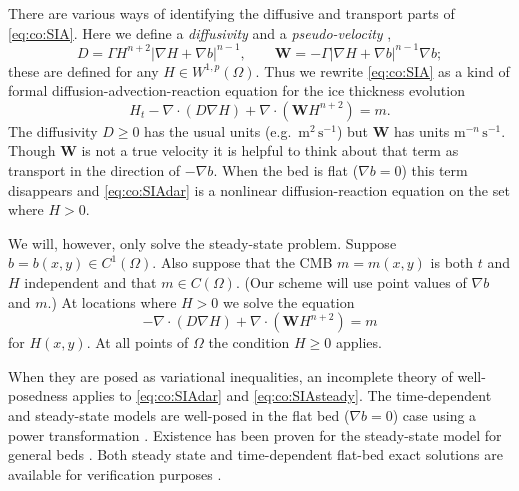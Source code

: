 \documentclass[final,leqno,onefignum,onetabnum]{siamltex1213bueler}
\newcommand\bW{\mathbf{W}}
\newcommand{\Div}{\nabla\cdot}
\renewcommand{\grad}{\nabla}
\begin{document}
There are various ways of identifying the diffusive and transport parts of \eqref{eq:co:SIA}.  Here we define a \emph{diffusivity} and a \emph{pseudo-velocity} \cite{Bueler2016},
\begin{equation}
D = \Gamma H^{n+2} |\grad H + \grad b|^{n-1}, \qquad \mathbf{W} = - \Gamma |\grad H + \grad b|^{n-1} \grad b;  \label{eq:co:DWdefns}
\end{equation}
these are defined for any $H\in W^{1,p}(\Omega)$.  Thus we rewrite \eqref{eq:co:SIA} as a kind of formal diffusion-advection-reaction equation for the ice thickness evolution
\begin{equation}
H_t - \Div\left(D \grad H\right) + \Div\left(\bW H^{n+2}\right) = m.   \label{eq:co:SIAdar}
\end{equation}
The diffusivity $D \ge 0$ has the usual units (e.g.~$\text{m}^2 \,\text{s}^{-1}$) but $\bW$ has units $\text{m}^{-n} \,\text{s}^{-1}$.  Though $\bW$ is not a true velocity it is helpful to think about that term as transport in the direction of $-\grad b$.  When the bed is flat ($\grad b=0$) this term disappears and \eqref{eq:co:SIAdar} is a nonlinear diffusion-reaction equation on the set where $H>0$.

We will, however, only solve the steady-state problem.  Suppose $b=b(x,y)\in C^1(\Omega)$.  Also suppose that the CMB $m=m(x,y)$ is both $t$ and $H$ independent and that $m \in C(\Omega)$.  (Our scheme will use point values of $\grad b$ and $m$.)  At locations where $H>0$ we solve the equation
\begin{equation}
- \Div\left(D \grad H\right) + \Div\left(\bW H^{n+2}\right) = m   \label{eq:co:SIAsteady}
\end{equation}
for $H(x,y)$.  At all points of $\Omega$ the condition $H\ge 0$ applies.

When they are posed as variational inequalities, an incomplete theory of well-posedness applies to \eqref{eq:co:SIAdar} and \eqref{eq:co:SIAsteady}.  The time-dependent and steady-state models are well-posed in the flat bed ($\grad b=0$) case \cite{Calvoetal2003} using a power transformation \cite{Raviart1970}.  Existence has been proven for the steady-state model for general beds \cite{JouvetBueler2012}.  Both steady state and time-dependent flat-bed exact solutions are available for verification purposes \cite{vanderVeen2013}.
\end{document}
